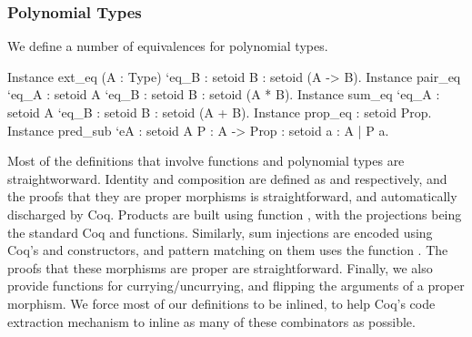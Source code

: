 \documentclass[ a4paper, UKenglish, cleveref, autoref, thm-restate]{lipics-v2021}
\begin{document}
\subsubsection{Polynomial Types}
We define a number of equivalences for polynomial types.
\begin{coqcode}
Instance ext_eq (A : Type) `{eq_B : setoid B} : setoid (A -> B).
Instance pair_eq `{eq_A : setoid A} `{eq_B : setoid B} : setoid (A * B).
Instance sum_eq `{eq_A : setoid A} `{eq_B : setoid B} : setoid (A + B).
Instance prop_eq : setoid Prop.
Instance pred_sub `{eA : setoid A} {P : A -> Prop} : setoid {a : A | P a}.
\end{coqcode}
Most of the definitions that involve functions and polynomial types are
straightworward.  Identity and composition are defined as 
 and  
respectively, and the proofs that they are proper morphisms is straightforward,
and automatically discharged by Coq. 
Products are built using function ,
with the projections being the standard Coq   and
 functions. Similarly, sum injections are encoded using
Coq's  and  constructors, and
pattern matching on them uses the function 
.
The proofs that these morphisms are proper are straightforward.  Finally, we
also provide functions for currying/uncurrying, and  flipping the arguments of
a proper morphism. We force most of our definitions to be inlined, to help
Coq's code extraction mechanism to inline as many of these combinators as
possible.
\end{document}
